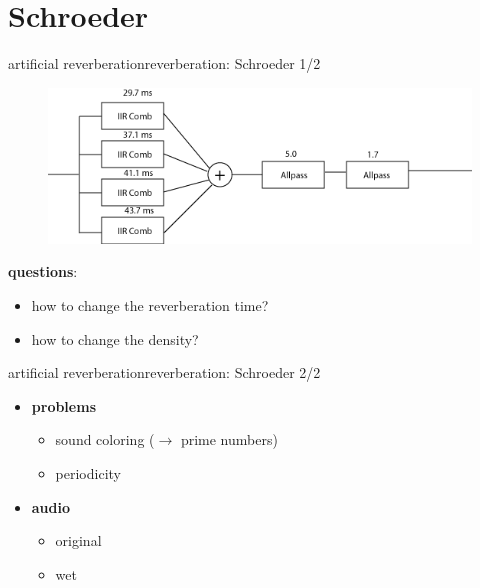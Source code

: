 \section{Schroeder}
\begin{frame}{artificial reverberation}{reverberation: Schroeder 1/2}
		\begin{figure}
			\centerline{\includegraphics[scale=.5]{graph/schroeder}}
		\end{figure} 
		
		\pause
		\textbf{questions}:
		\begin{itemize}
			\item	how to change the reverberation time?
			\item	how to change the density?
		\end{itemize}
\end{frame}

\begin{frame}{artificial reverberation}{reverberation: Schroeder 2/2}
    \begin{itemize}
        \item   \textbf{problems}
            \begin{itemize}
                \item	sound coloring ($\rightarrow$ prime numbers)
                \item	periodicity
            \end{itemize}
        \pause
        \bigskip
        \item   \textbf{audio}
            \begin{itemize}
                \item   original 
                \item   wet 
            \end{itemize}
    \end{itemize}
\end{frame}


